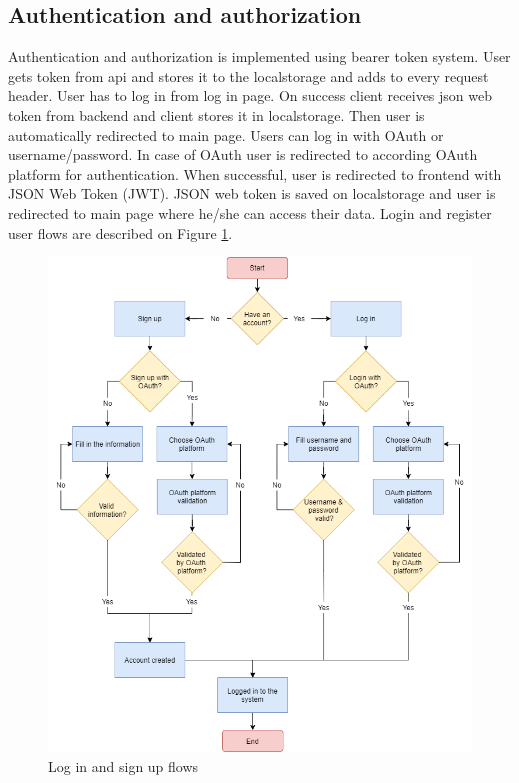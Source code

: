 \subsection{Authentication and authorization}\label{subsec:authentication-and-authorization}
Authentication and authorization is implemented using bearer token system.
User gets token from api and stores it to the localstorage and adds to every request header.
User has to log in from log in page.
On success client receives json web token from backend and client stores it in localstorage.
Then user is automatically redirected to main page.
Users can log in with OAuth or username/password.
In case of OAuth user is redirected to according OAuth platform for authentication.
When successful, user is redirected to frontend with JSON Web Token (JWT).
JSON web token is saved on localstorage and user is redirected to main page where he/she can access their data.
Login and register user flows are described on Figure
\ref{fig:login-signup-diagram}.

\begin{figure}[h]
    \includegraphics[width=\textwidth]{figures/login_signup_diagram}
    \caption{Log in and sign up flows}
    \label{fig:login-signup-diagram}
\end{figure}

